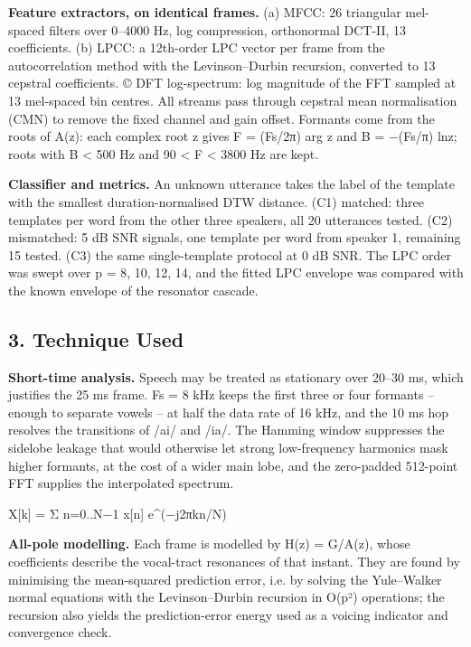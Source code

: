 \documentclass[
]{article}
\newenvironment{Shaded}{}{}
\newcommand{\NormalTok}[1]{#1}
\begin{document}
\textbf{Feature extractors, on identical frames.} (a) MFCC: 26
triangular mel-spaced filters over 0--4000 Hz, log compression,
orthonormal DCT-II, 13 coefficients. (b) LPCC: a 12th-order LPC vector
per frame from the autocorrelation method with the Levinson--Durbin
recursion, converted to 13 cepstral coefficients. © DFT log-spectrum:
log magnitude of the FFT sampled at 13 mel-spaced bin centres. All
streams pass through cepstral mean normalisation (CMN) to remove the
fixed channel and gain offset. Formants come from the roots of A(z):
each complex root z gives F = (Fs/2π) arg z and B = −(Fs/π)
ln\textbar z\textbar; roots with B \textless{} 500 Hz and 90 \textless{}
F \textless{} 3800 Hz are kept.

\textbf{Classifier and metrics.} An unknown utterance takes the label of
the template with the smallest duration-normalised DTW distance. (C1)
matched: three templates per word from the other three speakers, all 20
utterances tested. (C2) mismatched: 5 dB SNR signals, one template per
word from speaker 1, remaining 15 tested. (C3) the same single-template
protocol at 0 dB SNR. The LPC order was swept over p = 8, 10, 12, 14,
and the fitted LPC envelope was compared with the known envelope of the
resonator cascade.

\subsection{3. Technique Used}\label{3-technique-used}

\textbf{Short-time analysis.} Speech may be treated as stationary over
20--30 ms, which justifies the 25 ms frame. Fs = 8 kHz keeps the first
three or four formants -- enough to separate vowels -- at half the data
rate of 16 kHz, and the 10 ms hop resolves the transitions of /ai/ and
/ia/. The Hamming window suppresses the sidelobe leakage that would
otherwise let strong low-frequency harmonics mask higher formants, at
the cost of a wider main lobe, and the zero-padded 512-point FFT
supplies the interpolated spectrum.

\begin{Shaded}
\begin{Highlighting}[]
\NormalTok{X[k] = Σ n=0..N−1 x[n] e\^{}(−j2πkn/N)}
\end{Highlighting}
\end{Shaded}

\textbf{All-pole modelling.} Each frame is modelled by H(z) = G/A(z),
whose coefficients describe the vocal-tract resonances of that instant.
They are found by minimising the mean-squared prediction error, i.e. by
solving the Yule--Walker normal equations with the Levinson--Durbin
recursion in O(p²) operations; the recursion also yields the
prediction-error energy used as a voicing indicator and convergence
check.
\end{document}
